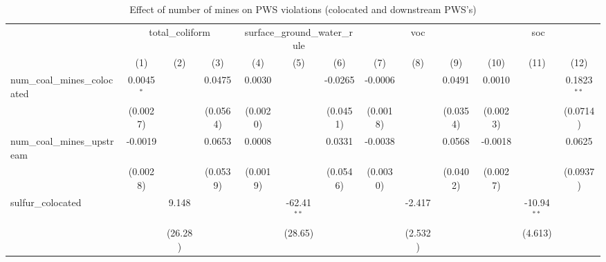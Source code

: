 
\begin{table}[htbp]
   \caption{\label{olsrf2sls_nummine_non_mine_vio_binary_1985to2005allhucs_colocateddownstream} Effect of number of mines on PWS violations (colocated and downstream PWS's)}
   \bigskip
   \centering
   \begin{adjustbox}{width = \textwidth, center}
      \begin{tabular}{lcccccccccccc}
         \toprule
          & \multicolumn{3}{c}{total\_coliform} & \multicolumn{3}{c}{surface\_ground\_water\_rule} & \multicolumn{3}{c}{voc} & \multicolumn{3}{c}{soc}\\
                                                            & (1)           & (2)           & (3)           & (4)           & (5)           & (6)           & (7)           & (8)           & (9)           & (10)                  & (11)          & (12)\\  
         \midrule 
         num\_coal\_mines\_colocated                        & 0.0045$^{*}$  &               & 0.0475        & 0.0030        &               & -0.0265       & -0.0006       &               & 0.0491        & 0.0010                &               & 0.1823$^{**}$\\   
                                                            & (0.0027)      &               & (0.0564)      & (0.0020)      &               & (0.0451)      & (0.0018)      &               & (0.0354)      & (0.0023)              &               & (0.0714)\\   
         num\_coal\_mines\_upstream                         & -0.0019       &               & 0.0653        & 0.0008        &               & 0.0331        & -0.0038       &               & 0.0568        & -0.0018               &               & 0.0625\\   
                                                            & (0.0028)      &               & (0.0539)      & (0.0019)      &               & (0.0546)      & (0.0030)      &               & (0.0402)      & (0.0027)              &               & (0.0937)\\   
         sulfur\_colocated                                  &               & 9.148         &               &               & -62.41$^{**}$ &               &               & -2.417        &               &                       & -10.94$^{**}$ &   \\   
                                                            &               & (26.28)       &               &               & (28.65)       &               &               & (2.532)       &               &                       & (4.613)       &   \\   

\end{tabular}
\end{adjustbox}
\end{table}
